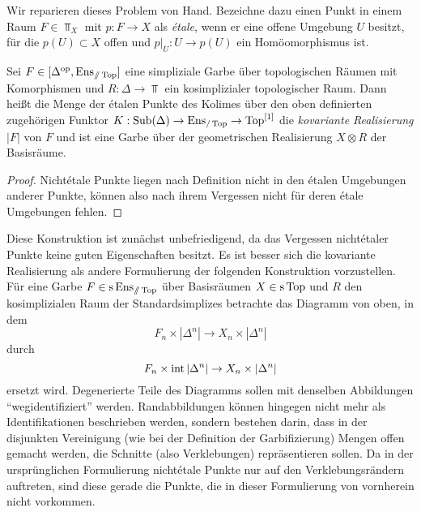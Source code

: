 Wir reparieren dieses Problem von Hand. Bezeichne dazu einen Punkt in
einem Raum $F \in \Top_X$ mit $p: F \to X$ als \emph{étale}, wenn er
eine offene Umgebung $U$ besitzt, für die $p(U) \subset X$ offen und
$p|_U: U \to p(U)$ ein Homöomorphismus ist.
\begin{satz} \label{real-enstop-cov}
  Sei $F \in [\Delta^\mathrm{op}, \operatorname{Ens}_{\mathbin{/\mkern-6mu/} \operatorname{Top}}]$ eine simpliziale Garbe über
  topologischen Räumen mit Komorphismen und $R: \Delta \to \Top$ ein
  kosimplizialer topologischer Raum. Dann heißt die Menge der étalen
  Punkte des Kolimes über den oben definierten zugehörigen Funktor $K:
  \operatorname{Sub}(\Delta) \to \operatorname{Ens}_{/\operatorname{Top}} \to \operatorname{Top}^{[1]}$ die \emph{kovariante
    Realisierung} $|F|$ von $F$ und ist eine Garbe über der
  geometrischen Realisierung $X \otimes R$ der Basisräume.
\end{satz}
\begin{proof}
  Nichtétale Punkte liegen nach Definition nicht in den étalen
  Umgebungen anderer Punkte, können also nach ihrem Vergessen nicht
  für deren étale Umgebungen fehlen.
\end{proof}
\begin{bem}
  Diese Konstruktion ist zunächst unbefriedigend, da das Vergessen
  nichtétaler Punkte keine guten Eigenschaften besitzt. Es ist besser
  sich die kovariante Realisierung als andere Formulierung der
  folgenden Konstruktion vorzustellen. Für eine Garbe $F \in
  \operatorname{s}\operatorname{Ens}_{\mathbin{/\mkern-6mu/} \operatorname{Top}}$ über Basisräumen $X \in \operatorname{s}\operatorname{Top}$ und $R$ den
  kosimplizialen Raum der Standardsimplizes betrachte das Diagramm von
  oben, in dem
  \[ F_n \times |\Delta^n| \to X_n \times |\Delta^n| \]
  durch
  \[ F_n \times \operatorname{int} |\Delta^n| \to X_n \times |\Delta^n| \]
  ersetzt wird. Degenerierte Teile des Diagramms sollen mit denselben
  Abbildungen ``wegidentifiziert'' werden. Randabbildungen können
  hingegen nicht mehr als Identifikationen beschrieben werden, sondern
  bestehen darin, dass in der disjunkten Vereinigung (wie bei der
  Definition der Garbifizierung) Mengen offen gemacht werden, die
  Schnitte (also Verklebungen) repräsentieren sollen. Da in der
  ursprünglichen Formulierung nichtétale Punkte nur auf den
  Verklebungsrändern auftreten, sind diese gerade die Punkte, die in
  dieser Formulierung von vornherein nicht vorkommen.
\end{bem}
